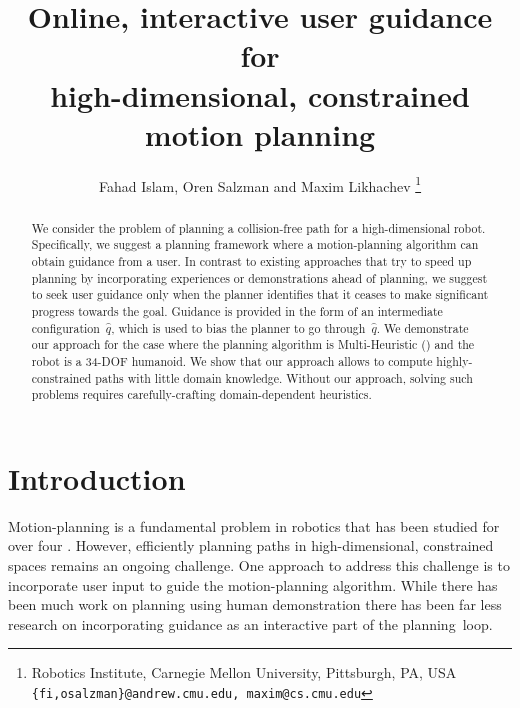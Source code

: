 \documentclass{article}
\title{	Online, interactive user guidance for \\
		high-dimensional, constrained motion planning }
\author{Fahad Islam, Oren Salzman and Maxim Likhachev%
  \thanks{Robotics Institute, Carnegie Mellon University, Pittsburgh, PA, USA
    {\tt\small \{fi,osalzman\}@andrew.cmu.edu, maxim@cs.cmu.edu}
  }%
}
\begin{document}
\maketitle
\thispagestyle{empty}
\pagestyle{empty}


\begin{abstract}
We consider the problem of planning a collision-free path for a high-dimensional robot.
Specifically, we suggest a planning framework where a motion-planning algorithm can obtain guidance from a user.
In contrast to existing approaches that try to speed up planning by incorporating experiences or demonstrations ahead of planning, 
we suggest to seek user guidance only when the planner identifies that it ceases to make significant progress towards the goal.
Guidance is provided in the form of an intermediate configuration~$\hat{q}$, which is used to bias the planner to go through~$\hat{q}$.
We demonstrate our approach for the case where the planning algorithm is Multi-Heuristic \astar (\mhastar) and the robot is a 34-DOF humanoid.
We show that our approach allows to compute highly-constrained paths with little domain knowledge.
Without our approach, solving such problems requires carefully-crafting domain-dependent heuristics. 
\end{abstract}



\section{Introduction}
\label{sec:intro}

Motion-planning is a fundamental problem in robotics that has been studied for over four .
However, efficiently planning paths in high-dimensional, constrained spaces remains an ongoing challenge.
One approach to address this challenge is to incorporate user input to guide the motion-planning algorithm.
While there has been much work on planning using human demonstration 
there has been far less research on incorporating guidance as an interactive part of the planning~loop.
\end{document}

